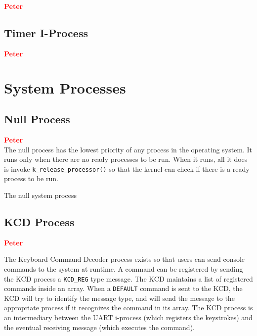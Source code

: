 \documentclass[12pt]{report}
\begin{document}
\textcolor{red}{\textbf{Peter}} \\

\subsection{Timer I-Process}

\textcolor{red}{\textbf{Peter}} \\



\section{System Processes}

\subsection{Null Process}

\textcolor{red}{\textbf{Peter}} \\

The null process has the lowest priority of any process in the operating system. It runs only when there are no ready processes to be run. When it runs, all it does is invoke {\tt k\_release\_processor()} so that the kernel can check if there is a ready process to be run.

\begin{algorithm}
  \caption{The null system process}
  \begin{algorithmic}[1]
			\State {}
		\EndWhile
    \EndProcedure
  \end{algorithmic}
\end{algorithm}

\subsection{KCD Process}

\textcolor{red}{\textbf{Peter}}

The Keyboard Command Decoder process exists so that users can send console commands to the system at runtime. A command can be registered by sending the KCD process a {\tt KCD\_REG} type message. The KCD maintains a list of registered commands inside an array. When a {\tt DEFAULT} command is sent to the KCD, the KCD will try to identify the message type, and will send the message to the appropriate process if it recognizes the command in its array. The KCD process is an intermediary between the UART i-process (which registers the keystrokes) and the eventual receiving message (which executes the command).\\
\end{document}
